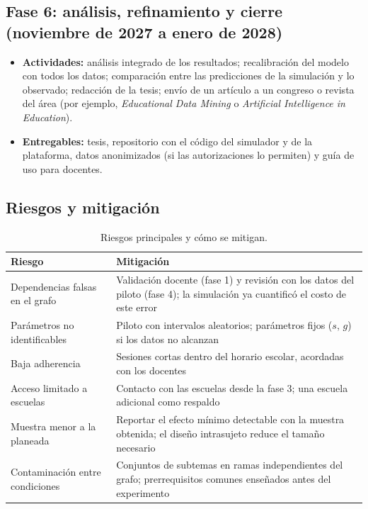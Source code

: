 \documentclass[12pt]{article}
\theoremstyle{definition}
\begin{document}
\subsection{Fase 6: análisis, refinamiento y cierre (noviembre de 2027 a enero de 2028)}

\begin{itemize}
\item \textbf{Actividades:} análisis integrado de los resultados; recalibración del modelo con todos los datos; comparación entre las predicciones de la simulación y lo observado; redacción de la tesis; envío de un artículo a un congreso o revista del área (por ejemplo, \emph{Educational Data Mining} o \emph{Artificial Intelligence in Education}).
\item \textbf{Entregables:} tesis, repositorio con el código del simulador y de la plataforma, datos anonimizados (si las autorizaciones lo permiten) y guía de uso para docentes.
\end{itemize}

\subsection{Riesgos y mitigación}

\begin{table}[H]
\centering\small
\caption{Riesgos principales y cómo se mitigan.}
\label{tab:riesgos}
\begin{tabularx}{\textwidth}{@{}P{4.2cm}Y@{}}
\toprule
\textbf{Riesgo} & \textbf{Mitigación} \\
\midrule
Dependencias falsas en el grafo & Validación docente (fase 1) y revisión con los datos del piloto (fase 4); la simulación ya cuantificó el costo de este error \\
Parámetros no identificables & Piloto con intervalos aleatorios; parámetros fijos ($s$, $g$) si los datos no alcanzan \\
Baja adherencia & Sesiones cortas dentro del horario escolar, acordadas con los docentes \\
Acceso limitado a escuelas & Contacto con las escuelas desde la fase 3; una escuela adicional como respaldo \\
Muestra menor a la planeada & Reportar el efecto mínimo detectable con la muestra obtenida; el diseño intrasujeto reduce el tamaño necesario \\
Contaminación entre condiciones & Conjuntos de subtemas en ramas independientes del grafo; prerrequisitos comunes enseñados antes del experimento \\
\bottomrule
\end{tabularx}
\end{table}
\end{document}
